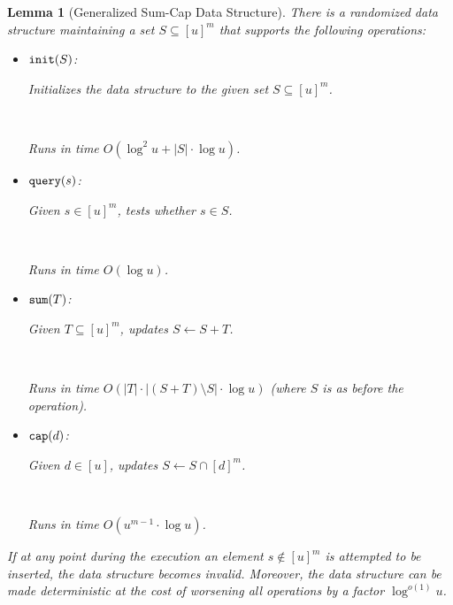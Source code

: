 \documentclass[10pt,a4paper]{article}
\newtheorem{lemma}{Lemma}[section]
\newcommand\Order{O}
\newcommand\order{o}
\newcommand\Oo{O}
\newcommand{\Op}[1]{{\normalfont\texttt{#1}}}
\begin{document}
\begin{lemma}[Generalized Sum-Cap Data Structure]
    \label{lem:generalized-set-ds}
    There is a randomized data structure maintaining a set $S \subseteq [u]^m$ that supports the following operations:
    \smallskip
    \begin{itemize}
        \item \parbox{2.2cm}{$\Op{init}(S)$:} Initializes the data structure to the given set $S \subseteq [u]^m$.\\\parbox{2.2cm}{~} Runs in time $\Oo(\log^2 u +|S| \cdot \log u )$.
        
        \item \parbox{2.2cm}{$\Op{query}(s)$:} Given $s \in [u]^m$, tests whether $s \in S$.\\\parbox{2.2cm}{~} Runs in time $\Order(\log u)$.
        
        \item \parbox{2.2cm}{$\Op{sum}(T)$:} Given $T \subseteq [u]^m$, updates $S \gets S + T$.\\\parbox{2.2cm}{~} Runs in time $\Order(|T| \cdot |(S + T) \setminus S| \cdot \log u)$ (where $S$ is as before the operation).

        \item \parbox{2.2cm}{$\Op{cap}(d)$:} Given $d \in [u]$, updates $S \gets S \cap [d]^m$.\\\parbox{2.2cm}{~} Runs in time $\Order(u^{m-1} \cdot \log u)$.
    \end{itemize}
    \smallskip
    If at any point during the execution an element $s \not\in [u]^m$ is attempted to be inserted, the data structure becomes invalid.
    Moreover, the data structure can be made deterministic at the cost of worsening all operations by a factor $\log^{\order(1)} u$.
\end{lemma}
\end{document}

